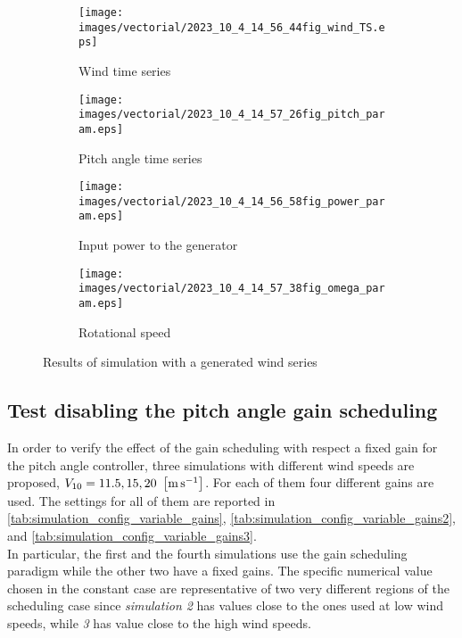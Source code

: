 \begin{figure}[htb]
  \begin{subfigure}{0.49\columnwidth}
    \centering
    \texttt{[image: images/vectorial/2023\_10\_4\_14\_56\_44fig\_wind\_TS.eps]}
    \caption{Wind time series}
    \label{fig:2023_05_1_00_55_48fig_wind_TS.eps}
  \end{subfigure}
  \begin{subfigure}{0.49\columnwidth}
    \centering
    \texttt{[image: images/vectorial/2023\_10\_4\_14\_57\_26fig\_pitch\_param.eps]}
    \caption{Pitch angle time series}
    \label{fig:2023_05_1_00_50_19fig_power_param}
  \end{subfigure}
  \begin{subfigure}{0.49\columnwidth}
    \centering
    \texttt{[image: images/vectorial/2023\_10\_4\_14\_56\_58fig\_power\_param.eps]}
    \caption{Input power to the generator}
    \label{fig:2023_05_1_00_51_17fig_omega_param}
  \end{subfigure}
  \begin{subfigure}{0.49\columnwidth}
    \centering
    \texttt{[image: images/vectorial/2023\_10\_4\_14\_57\_38fig\_omega\_param.eps]}
    \caption{Rotational speed}
    \label{fig:2023_05_1_00_50_58fig_pitch_param}
  \end{subfigure}
  \caption{Results of simulation with a generated wind series}
  \label{fig:simulation_rand_wind_NPC}
\end{figure}

\subsection{Test disabling the pitch angle gain scheduling}\label{subsec:gain_scheduling_disabling}
In order to verify the effect of the gain scheduling with respect a fixed gain for the pitch angle controller, three simulations with different wind speeds are proposed, $V_{10} = 11.5, 15, 20 \ \left[\si{\meter\per\second}\right]$. For each of them four different gains are used. The settings for all of them are reported in \autoref{tab:simulation_config_variable_gains}, \autoref{tab:simulation_config_variable_gains2}, and \autoref{tab:simulation_config_variable_gains3}. \\
In particular, the first and the fourth simulations use the gain scheduling paradigm while the other two have a fixed gains. The specific numerical value chosen in the constant case are representative of two very different regions of the scheduling case since \textit{simulation 2} has values close to the ones used at low wind speeds, while \textit{3} has value close to the high wind speeds. 

